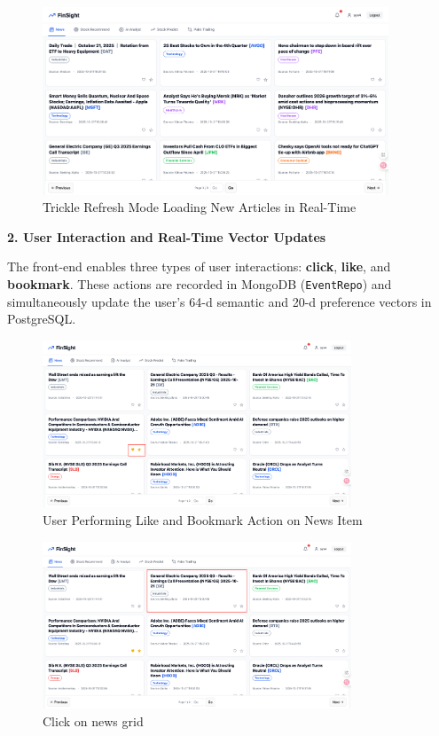 \begin{figure}[H]
  \centering
  \includegraphics[width=0.92\textwidth]{images/news/refresh.png}
  \caption{Trickle Refresh Mode Loading New Articles in Real-Time}
  \label{fig:refresh}
\end{figure}

\textbf{2. User Interaction and Real-Time Vector Updates}

The front-end enables three types of user interactions: \textbf{click}, \textbf{like}, and \textbf{bookmark}. These actions are recorded in MongoDB (\texttt{EventRepo}) and simultaneously update the user's 64-d semantic and 20-d preference vectors in PostgreSQL.

\begin{figure}[H]
  \centering
  \includegraphics[width=0.82\textwidth]{images/news/page2.png}
  \caption{User Performing Like and Bookmark Action on News Item}
  \label{fig:page2}
\end{figure}


\begin{figure}[H]
  \centering
  \includegraphics[width=0.82\textwidth]{images/news/clk1.png}
  \caption{Click on news grid}
  \label{fig:clk1}
\end{figure}

